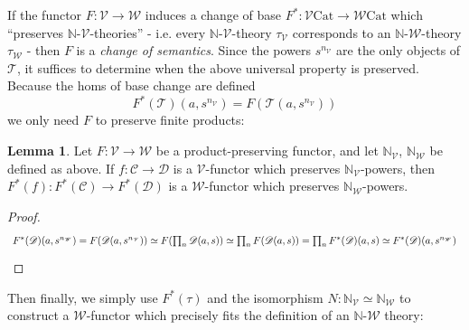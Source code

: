 \documentclass[a4paper,UKenglish]{article}
\theoremstyle{definition}
\newtheorem{lemma}[theorem]{Lemma}
\newcommand{\Cat}{\mathrm{Cat}}
\newcommand{\NN}{\mathbb{N}}
\newcommand{\V}{\mathscr{V}}
\newcommand{\W}{\mathscr{W}}
\newcommand{\C}{\mathscr{C}}
\newcommand{\D}{\mathscr{D}}
\newcommand{\T}{\mathscr{T}}
\begin{document}
If the functor $F:\V \to \W$ induces a change of base $F^*:\V\Cat \to \W\Cat$ which ``preserves $\NN$-$\V$-theories'' - i.e. every $\NN$-$\V$-theory $\tau_\V$ corresponds to an $\NN$-$\W$-theory $\tau_\W$ - then $F$ is a \textit{change of semantics}. Since the powers $s^{n_\V}$ are the only objects of $\T$, it suffices to determine when the above universal property is preserved. Because the homs of base change are defined $$F^*(\T)(a,s^{n_\V}) = F(\T(a,s^{n_\V}))$$ we only need $F$ to preserve finite products:

\begin{lemma}
	Let $F: \V \to \W$ be a product-preserving functor, and let $\NN_\V$, $\NN_\W$ be defined as above. If $f: \C \to \D$ is a $\V$-functor which preserves $\NN_\V$-powers, then $F^*(f):F^*(\C)\to F^*(\D)$ is a $\W$-functor which preserves $\NN_\W$-powers.	
\end{lemma}
\begin{proof}
	\[\begin{tikzcd}
	F^*(\D)(a,s^{n_\W}) = F(\D(a,s^{n_\V})) \simeq F(\prod_n \D(a,s)) \simeq \prod_n F(\D(a,s)) = \prod_n F^*(\D)(a,s) \simeq F^*(\D)(a,s^{n_\W})
	\end{tikzcd}\]
\end{proof}

Then finally, we simply use $F^*(\tau)$ and the isomorphism $N: \NN_\V \simeq \NN_\W$ to construct a $\W$-functor which precisely fits the definition of an $\NN$-$\W$ theory:
\end{document}
